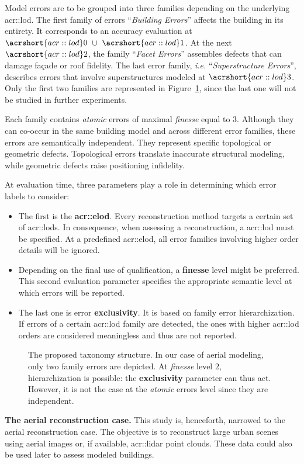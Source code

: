 \documentclass[runningheads]{llncs}
\begin{document}
Model errors are to be grouped into three families depending on the underlying \acrshort{acr::lod}. The first family of errors ``\textit{Building Errors}'' affects the building in its entirety. It corresponds to an accuracy evaluation at $\acrshort{acr::lod}0\text{ } \cup \text{ }\acrshort{acr::lod}1$. At the next $\acrshort{acr::lod}2$, the family ``\textit{Facet Errors}'' assembles defects that can damage fa\c{c}ade or roof fidelity. The last error family, \textit{i.e.} ``\textit{Superstructure Errors}'', describes errors that involve superstructures modeled at $\acrshort{acr::lod}3$. Only the first two families are represented in Figure~\ref{fig::taxonomy}, since the last one will not be studied in further experiments.

Each family contains \textit{atomic} errors of maximal \textit{finesse} equal to $3$. Although they can co-occur in the same building model and across different error families, these errors are semantically independent. They represent specific topological or geometric defects. Topological errors translate inaccurate structural modeling, while geometric defects raise positioning infidelity.

At evaluation time, three parameters play a role in determining which error labels to consider:
\begin{itemize}
    \item The first is the \textbf{\acrfull{acr::elod}}. Every reconstruction method targets a certain set of \glspl{acr::lod}. In consequence, when assessing a reconstruction, a \acrshort{acr::lod} must be specified. At a predefined \acrshort{acr::elod}, all error families involving higher order details will be ignored.
    \item Depending on the final use of qualification, a \textbf{finesse} level might be preferred. This second evaluation parameter specifies the appropriate semantic level at which errors will be reported.
    \item The last one is error \textbf{exclusivity}. It is based on family error hierarchization. If errors of a certain \acrshort{acr::lod} family are detected, the ones with higher \acrshort{acr::lod} orders are considered meaningless and thus are not reported.
\end{itemize}

	\begin{figure}
        \begin{center}
            
            \caption{\label{fig::taxonomy} The proposed taxonomy structure. In our case of aerial modeling, only two family errors are depicted. At \textit{finesse} level $2$, hierarchization is possible: the \textbf{exclusivity} parameter can thus act. However, it is not the case at the \textit{atomic} errors level since they are independent. }
        \end{center}
    \end{figure}
\noindent
\textbf{The aerial reconstruction case.}
This study is, henceforth, narrowed to the aerial reconstruction case. The objective is to reconstruct large urban scenes using aerial images or, if available, \acrshort{acr::lidar} point clouds. These data could also be used later to assess modeled buildings.
\end{document}
